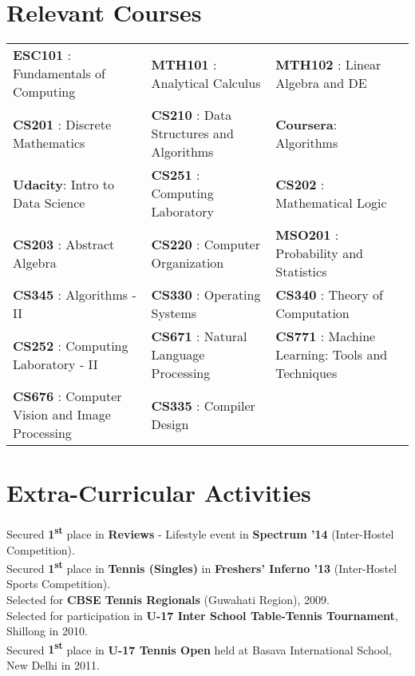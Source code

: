 \documentclass[a4paper]{norm-resume}
\begin{document}

\section{Relevant Courses \hrulefill}

\vspace{2mm} %
		
\begin{small}
	\begin{tabularx}{\textwidth}{X X l}
	{\textbf{ESC101} : Fundamentals of Computing} & {\textbf{MTH101} : Analytical Calculus} &{\textbf{MTH102} : Linear Algebra and DE}\\
	{\textbf{CS201} : Discrete Mathematics}&{\textbf{CS210 }: Data Structures and Algorithms} & {\textbf{Coursera}: Algorithms }\\
	{\textbf{Udacity}: Intro to Data Science } & {\textbf{CS251} : Computing Laboratory} &{\textbf{CS202} : Mathematical Logic} \\ 
	{\textbf{CS203} : Abstract Algebra} & {\textbf{CS220} : Computer Organization} & {\textbf{MSO201} : Probability and Statistics}\\
	{\textbf{CS345} : Algorithms - II}&{\textbf{CS330} : Operating Systems}&{\textbf{CS340} : Theory of Computation}\\
	{\textbf{CS252} : Computing Laboratory - II}&{\textbf{CS671} : Natural Language Processing} &{\textbf{CS771} : \scriptsize{Machine Learning: Tools and Techniques}}\\
	{\textbf{CS676} : \scriptsize{Computer Vision and Image Processing}}&{\textbf{CS335} : Compiler Design}
	& {\hfill \footnotesize\emphasize{* - Ongoing}}\\
	\end{tabularx}
\end{small}	

\vspace{2mm}	%


\section{Extra-Curricular Activities \hrulefill}

\vspace{2mm} %
	
	Secured \textbf{1\textsuperscript{st}} place in \textbf{Reviews} - Lifestyle event in \textbf{Spectrum '14} (Inter-Hostel Competition).\\
	Secured \textbf{1\textsuperscript{st}} place in \textbf{Tennis (Singles)} in \textbf{Freshers' Inferno '13} (Inter-Hostel Sports Competition).\\	
	Selected for \textbf{CBSE Tennis Regionals} (Guwahati Region), 2009.\\
	Selected for participation in \textbf{U-17 Inter School Table-Tennis Tournament}, Shillong in 2010.\\
	Secured \textbf{1\textsuperscript{st}} place in \textbf{U-17 Tennis Open} held at Basava International School, New Delhi in 2011.\\
\end{document}

